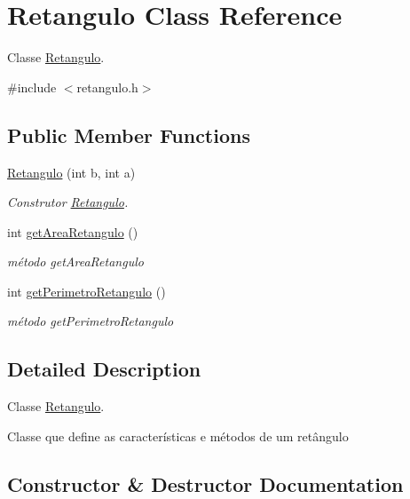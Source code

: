 \hypertarget{classRetangulo}{}\section{Retangulo Class Reference}
\label{classRetangulo}


Classe \hyperlink{classRetangulo}{Retangulo}.  




{\ttfamily \#include $<$retangulo.\+h$>$}

\subsection*{Public Member Functions}
\begin{DoxyCompactItemize}
\item 
\hyperlink{classRetangulo_ae67d346b04106aa2a6331fbc855f9313}{Retangulo} (int b, int a)
\begin{DoxyCompactList}\small\item\em Construtor \hyperlink{classRetangulo}{Retangulo}. \end{DoxyCompactList}\item 
int \hyperlink{classRetangulo_a4c7af729f538c0cfe9f134f36ad9e483}{get\+Area\+Retangulo} ()
\begin{DoxyCompactList}\small\item\em método get\+Area\+Retangulo \end{DoxyCompactList}\item 
int \hyperlink{classRetangulo_aa59e04b02d85fa75c9fb0896598647ac}{get\+Perimetro\+Retangulo} ()
\begin{DoxyCompactList}\small\item\em método get\+Perimetro\+Retangulo \end{DoxyCompactList}\end{DoxyCompactItemize}


\subsection{Detailed Description}
Classe \hyperlink{classRetangulo}{Retangulo}. 

Classe que define as características e métodos de um retângulo 

\subsection{Constructor \& Destructor Documentation}
